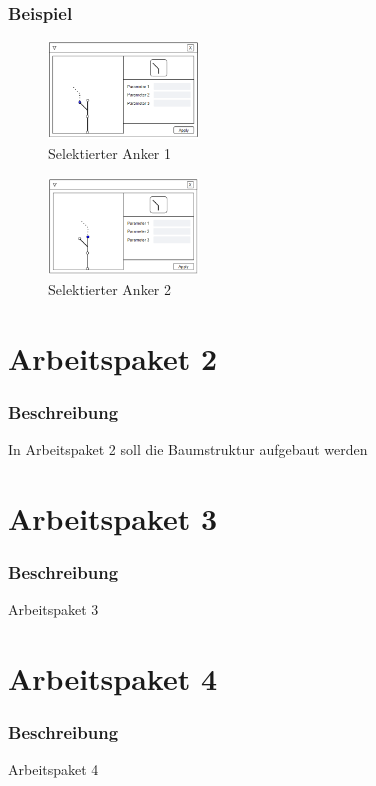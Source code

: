 \documentclass[12pt]{beamer}
\begin{document}
    \begin{frame}
        \frametitle{Beispiel}
        \begin{figure}
            \centering
            \includegraphics[width=4cm]{../images/UI_6.PNG}
            \caption{Selektierter Anker 1}
        \end{figure}
        \begin{figure}
            \centering
            \includegraphics[width=4cm]{../images/UI_7.PNG}
            \caption{Selektierter Anker 2}
        \end{figure}
    \end{frame}

    \section{Arbeitspaket 2}
    \begin{frame}
        \frametitle{Beschreibung}
        In Arbeitspaket 2 soll die Baumstruktur aufgebaut werden
    \end{frame}

    \section{Arbeitspaket 3}
    \begin{frame}
        \frametitle{Beschreibung}
        Arbeitspaket 3
    \end{frame}

    \section{Arbeitspaket 4}
    \begin{frame}
        \frametitle{Beschreibung}
        Arbeitspaket 4
    \end{frame}
\end{document}
